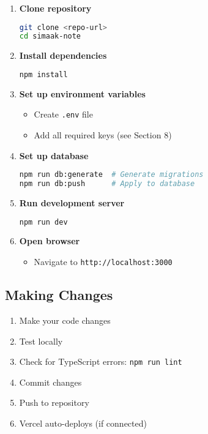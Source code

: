\documentclass[11pt,a4paper]{article}
\begin{document}
\begin{enumerate}
    \item \textbf{Clone repository}
    \begin{lstlisting}[language=bash]
git clone <repo-url>
cd simaak-note
    \end{lstlisting}
    
    \item \textbf{Install dependencies}
    \begin{lstlisting}[language=bash]
npm install
    \end{lstlisting}
    
    \item \textbf{Set up environment variables}
    \begin{itemize}
        \item Create \texttt{.env} file
        \item Add all required keys (see Section 8)
    \end{itemize}
    
    \item \textbf{Set up database}
    \begin{lstlisting}[language=bash]
npm run db:generate  # Generate migrations
npm run db:push      # Apply to database
    \end{lstlisting}
    
    \item \textbf{Run development server}
    \begin{lstlisting}[language=bash]
npm run dev
    \end{lstlisting}
    
    \item \textbf{Open browser}
    \begin{itemize}
        \item Navigate to \texttt{http://localhost:3000}
    \end{itemize}
\end{enumerate}

\subsection{Making Changes}

\begin{enumerate}
    \item Make your code changes
    \item Test locally
    \item Check for TypeScript errors: \texttt{npm run lint}
    \item Commit changes
    \item Push to repository
    \item Vercel auto-deploys (if connected)
\end{enumerate}
\end{document}

